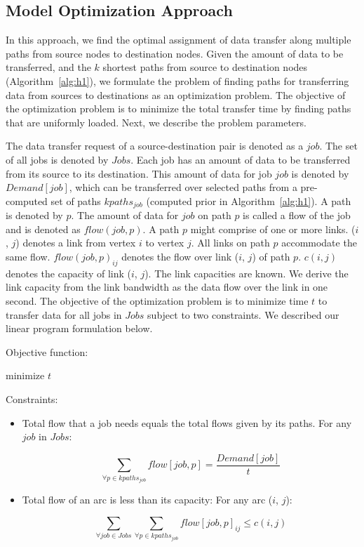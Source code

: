 \subsection{Model Optimization Approach}
\label{sec:optimization}

In this approach, we find the optimal assignment of data transfer along multiple paths from source nodes to destination nodes. Given the amount of data to be transferred, and the $k$ shortest paths from source to destination nodes (Algorithm~\ref{alg:h1}), we formulate the problem of finding paths for transferring data from sources to destinations as an optimization problem. The objective of the optimization problem is to minimize the total transfer time by finding paths that are uniformly loaded. Next, we describe the problem parameters.

The data transfer request of a source-destination pair is denoted as a $job$. The set of all jobs is denoted by $Jobs$. Each job has an amount of data to be transferred from its source to its destination. This amount of data for job $job$ is denoted by $Demand[job]$, which can be transferred over selected paths from a pre-computed set of paths $kpaths_{job}$ (computed prior in Algorithm~\ref{alg:h1}). A path is denoted by $p$. The amount of data for $job$ on path $p$ is called a flow of the job and is denoted as $flow(job, p)$. A path $p$ might comprise of one or more links. ($i$, $j$) denotes a link from vertex $i$ to vertex $j$. All links on path $p$ accommodate the same flow. $flow(job, p)_{ij}$ denotes the flow over link ($i$, $j$) of path $p$. $c(i,j)$ denotes the capacity of link ($i$, $j$). The link capacities are known. We derive the link capacity from the link bandwidth as the data flow over the link in one second. The objective of the optimization problem is to minimize time $t$ to transfer data for all jobs in $Jobs$ subject to two constraints. We described our linear program formulation below.

Objective function:

\begin{center}
minimize $t$
\end{center}

Constraints:
\begin{itemize}

\item Total flow that a job needs equals the total flows given by its paths. For any $job$ in $Jobs$: 

\begin{equation} 
\label{eq:jobflow}
\sum_{\forall p \in kpaths_{job}} flow[job, p]  = \frac{Demand[job]}{t}
\end{equation}

\item Total flow of an arc is less than its capacity: For any arc ($i$, $j$):

\begin{equation} 
\label{eq:linkcapacity}
\sum_{\forall job \in Jobs}\sum_{\forall p \in kpaths_{job}} flow[job, p]_{ij} \leq c(i, j)
\end{equation}

\end{itemize}

